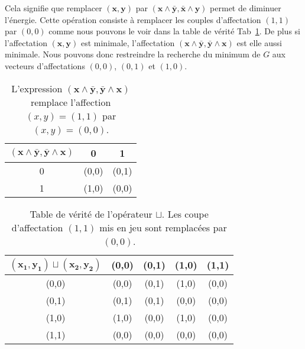 \documentclass[../main/These_Mathias_Paget.tex]{subfiles}
\begin{document}
Cela signifie que remplacer $(\boldsymbol{x},\boldsymbol{y})$ par $(\boldsymbol{x} \wedge \boldsymbol{\bar{y}}, \boldsymbol{\bar{x}} \wedge \boldsymbol{y})$ permet de diminuer l’énergie. Cette opération consiste à remplacer les couples d'affectation $(1,1)$ par $(0,0)$ comme nous pouvons le voir dans la table de vérité Tab~\ref{tab:wedge1}. De plus si l'affectation $(\boldsymbol{x},\boldsymbol{y})$ est minimale, l'affectation $(\boldsymbol{x} \wedge \boldsymbol{\bar{y}}, \boldsymbol{\bar{y}} \wedge \boldsymbol{x})$ est elle aussi minimale. Nous pouvons donc restreindre la recherche du minimum de $G$ aux vecteurs d'affectations $(0,0)$, $(0,1)$ et $(1,0)$.
	\begin{table}
	\centering
	\begin{tabular}{c|cc}
 	  $(\boldsymbol{x} \wedge \boldsymbol{\bar{y}}, \boldsymbol{\bar{y}} \wedge \boldsymbol{x})$    & 0 & 1 	\\ \hline
 	 0 & (0,0) & (0,1) \\
 	 1 & (1,0) & (0,0) \\
	\end{tabular}
	\caption{L'expression $(\boldsymbol{x} \wedge \boldsymbol{\bar{y}}, \boldsymbol{\bar{y}} \wedge \boldsymbol{x})$ remplace l’affection $(x,y)=(1,1)$ par $(x,y) =(0,0)$.}
	\label{tab:wedge1}
	\end{table}
	
	\begin{table}
	\centering
	\begin{tabular}{c|cccc}
 	  $ (\boldsymbol{x_1},\boldsymbol{y_1}) \sqcup (\boldsymbol{x_2},\boldsymbol{y_2})$    & (0,0) & (0,1) & (1,0) & (1,1)	\\ \hline
 	 (0,0) & (0,0) & (0,1) & (1,0) & (0,0)	\\
 	 (0,1) & (0,1) & (0,1) & (0,0) & (0,0)	\\
 	 (1,0) & (1,0) & (0,0) & (1,0) & (0,0)	\\
 	 (1,1) & (0,0) & (0,0) & (0,0) & (0,0)	\\
	\end{tabular}
	\caption{Table de vérité de l'opérateur $\sqcup$. Les coupe d'affectation $(1,1)$ mis en jeu sont remplacées par $(0,0)$.}
	\label{tab:wedge2}
	\end{table}
	
\end{document}
